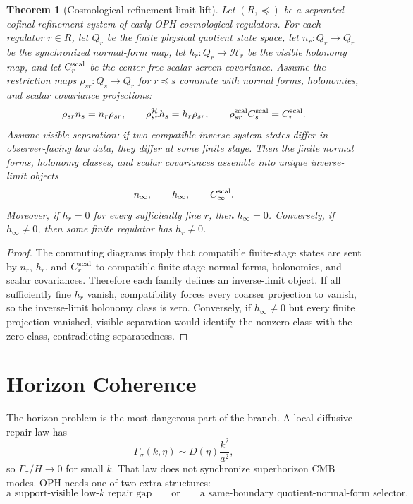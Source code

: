 \documentclass[11pt]{article}
\newtheorem{theorem}{Theorem}[section]
\begin{document}
\begin{theorem}[Cosmological refinement-limit lift]\label{thm:cosmo-refinement-lift}
Let \((R,\preceq)\) be a separated cofinal refinement system of early OPH cosmological regulators.
For each regulator \(r\in R\), let \(Q_r\) be the finite physical quotient state space, let
\(n_r:Q_r\to Q_r\) be the synchronized normal-form map, let \(h_r:Q_r\to\mathcal H_r\) be the
visible holonomy map, and let \(C_r^{\rm scal}\) be the center-free scalar screen covariance. Assume
the restriction maps \(\rho_{sr}:Q_s\to Q_r\) for \(r\preceq s\) commute with normal forms,
holonomies, and scalar covariance projections:
\[
\rho_{sr}n_s=n_r\rho_{sr},
\qquad
\rho^{\mathcal H}_{sr}h_s=h_r\rho_{sr},
\qquad
\rho^{\rm scal}_{sr}C_s^{\rm scal}=C_r^{\rm scal}.
\]
Assume visible separation: if two compatible inverse-system states differ in observer-facing law
data, they differ at some finite stage. Then the finite normal forms, holonomy classes, and scalar
covariances assemble into unique inverse-limit objects
\[
n_\infty,\qquad h_\infty,\qquad C_\infty^{\rm scal}.
\]
Moreover, if \(h_r=0\) for every sufficiently fine \(r\), then \(h_\infty=0\). Conversely, if
\(h_\infty\ne0\), then some finite regulator has \(h_r\ne0\).
\end{theorem}

\begin{proof}
The commuting diagrams imply that compatible finite-stage states are sent by \(n_r\), \(h_r\), and
\(C_r^{\rm scal}\) to compatible finite-stage normal forms, holonomies, and scalar covariances.
Therefore each family defines an inverse-limit object. If all sufficiently fine \(h_r\) vanish,
compatibility forces every coarser projection to vanish, so the inverse-limit holonomy class is zero.
Conversely, if \(h_\infty\ne0\) but every finite projection vanished, visible separation would
identify the nonzero class with the zero class, contradicting separatedness.
\end{proof}

\section{Horizon Coherence}

The horizon problem is the most dangerous part of the branch. A local diffusive repair law has
\[
\Gamma_\sigma(k,\eta)\sim D(\eta)\frac{k^2}{a^2},
\]
so \(\Gamma_\sigma/H\to0\) for small \(k\). That law does not synchronize superhorizon CMB modes.
OPH needs one of two extra structures:
\[
\boxed{\text{a support-visible low-\(k\) repair gap}}
\qquad\text{or}\qquad
\boxed{\text{a same-boundary quotient-normal-form selector}.}
\]
\end{document}
